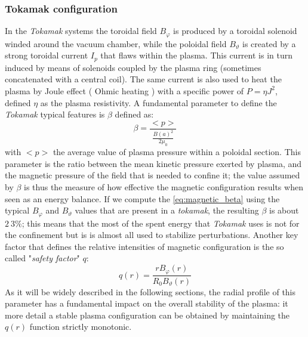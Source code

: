 \subsubsection{Tokamak configuration}
In the \textit{Tokamak} systems the toroidal field $B_\varphi$ is produced by a toroidal solenoid winded around the vacuum chamber, while the poloidal field $B_\vartheta$ is created by a strong toroidal current $I_p$ that flaws within the plasma. This current is in turn induced by means of solenoids coupled by the plasma ring (sometimes concatenated with a central coil). The same current is also used to heat the plasma by Joule effect ( Ohmic heating ) with a specific power of $P = \eta J^2$, defined $\eta$ as the plasma resistivity.
%
A fundamental parameter to define the \textit{Tokamak} typical features is $\beta$ defined as:
\begin{equation}
    \beta = \frac{<p>}{ \frac{B(a)^2}{2\mu_0} }
    \label{eq:magnetic_beta}
\end{equation}
with $<p>$ the average value of plasma pressure within a poloidal section. This parameter is the ratio between the mean kinetic pressure exerted by plasma, and the magnetic pressure of the field that is needed to confine it; the value assumed by $\beta$ is thus the measure of how effective the magnetic configuration results when seen as an energy balance.
If we compute the \eqref{eq:magnetic_beta} using the typical $B_\varphi$ and $B_\vartheta$ values that are present in a \textit{tokamak}, the resulting $\beta$ is about $2~3\%$; this means that the most of the spent energy that \textit{Tokamak} uses is not for the confinement but is is almost all used to stabilize perturbations.
Another key factor that defines the relative intensities of magnetic configuration is the so called "\textit{safety factor}" $q$:
\begin{equation}
    q(r) = \frac{rB_\varphi(r)}{R_0B_\vartheta(r)}
\end{equation}
As it will be widely described in the following sections, the radial profile of this parameter has a fundamental impact on the overall stability of the plasma: it more detail a stable plasma configuration can be obtained by maintaining the $q(r)$ function strictly monotonic.
